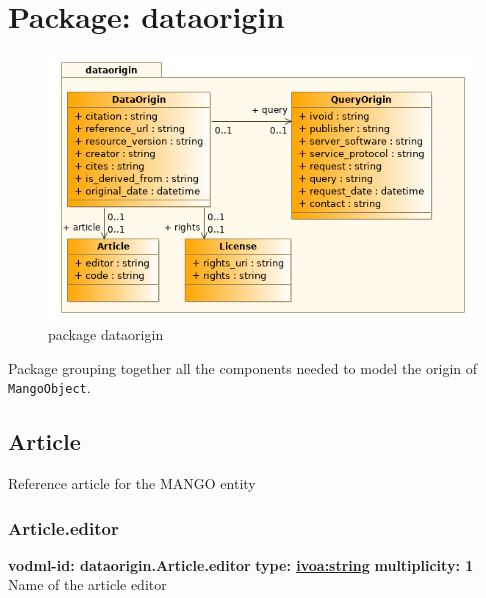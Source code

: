 \section{Package: dataorigin }
  \begin{figure}[h]
    \includegraphics[width=1.0\textwidth]{../model/dataorigin.png}
    \caption{package dataorigin}
    \label{fig:dataorigin}
  \end{figure}




  Package grouping together all the components needed to model the origin of \texttt{MangoObject}.

  \subsection{Article}
  \label{sect:dataorigin.Article}
    Reference article for the MANGO entity

    \subsubsection{Article.editor}
      \textbf{vodml-id: dataorigin.Article.editor} \newline
      \textbf{type: \hyperref[sect:ivoa]{ivoa:string}} \newline
      \textbf{multiplicity: 1} \newline
      Name of the article editor

